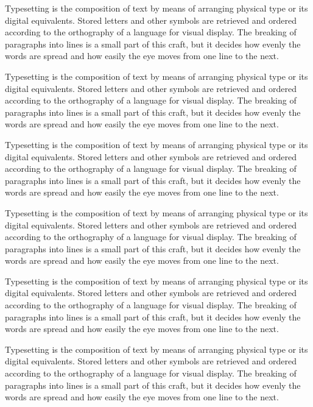 \documentclass{amsart}
\begin{document}
Typesetting is the composition of text by means of arranging physical type or its digital equivalents. Stored letters and other symbols are retrieved and ordered according to the orthography of a language for visual display. The breaking of paragraphs into lines is a small part of this craft, but it decides how evenly the words are spread and how easily the eye moves from one line to the next.

Typesetting is the composition of text by means of arranging physical type or its digital equivalents. Stored letters and other symbols are retrieved and ordered according to the orthography of a language for visual display. The breaking of paragraphs into lines is a small part of this craft, but it decides how evenly the words are spread and how easily the eye moves from one line to the next.

Typesetting is the composition of text by means of arranging physical type or its digital equivalents. Stored letters and other symbols are retrieved and ordered according to the orthography of a language for visual display. The breaking of paragraphs into lines is a small part of this craft, but it decides how evenly the words are spread and how easily the eye moves from one line to the next.

Typesetting is the composition of text by means of arranging physical type or its digital equivalents. Stored letters and other symbols are retrieved and ordered according to the orthography of a language for visual display. The breaking of paragraphs into lines is a small part of this craft, but it decides how evenly the words are spread and how easily the eye moves from one line to the next.

Typesetting is the composition of text by means of arranging physical type or its digital equivalents. Stored letters and other symbols are retrieved and ordered according to the orthography of a language for visual display. The breaking of paragraphs into lines is a small part of this craft, but it decides how evenly the words are spread and how easily the eye moves from one line to the next.

Typesetting is the composition of text by means of arranging physical type or its digital equivalents. Stored letters and other symbols are retrieved and ordered according to the orthography of a language for visual display. The breaking of paragraphs into lines is a small part of this craft, but it decides how evenly the words are spread and how easily the eye moves from one line to the next.
\end{document}
